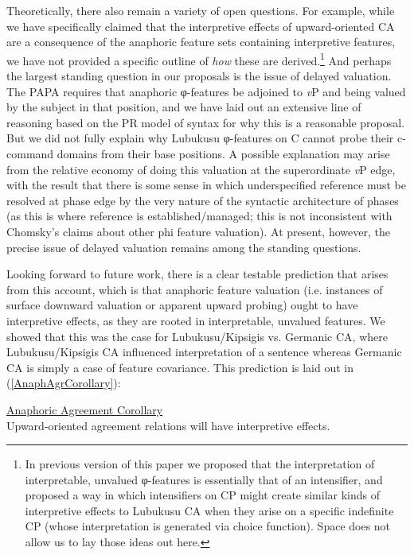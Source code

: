 \documentclass[output=paper
,modfonts
,nonflat
]{langsci/langscibook}
\begin{document}
Theoretically, there also remain a variety of open questions. For example, while we have specifically claimed that the interpretive effects of upward-oriented CA are a consequence of the anaphoric feature sets containing interpretive features, we have not provided a specific outline of \textit{how} these are derived.\footnote{In previous version of this paper we proposed that the interpretation of interpretable, unvalued φ-features is essentially that of an intensifier, and proposed a way in which intensifiers on CP might create similar kinds of interpretive effects to Lubukusu CA when they arise on a specific indefinite CP (whose interpretation is generated via choice function). Space does not allow us to lay those ideas out here.} And perhaps the largest standing question in our proposals is the issue of delayed valuation. The PAPA requires that anaphoric φ-features be adjoined to \textit{v}P and being valued by the subject in that position, and we have laid out an extensive line of reasoning based on the PR model of syntax for why this is a reasonable proposal. But we did not fully explain why Lubukusu φ-features on C cannot probe their c-command domains from their base positions. A possible explanation may arise from the relative economy of doing this valuation at the superordinate \textit{v}P edge, with the result that there is some sense in which underspecified reference must be resolved at phase edge by the very nature of the syntactic architecture of phases (as this is where reference is established/managed; this is not inconsistent with Chomsky's \citeyear{Chomsky:2008} claims about other phi feature valuation). At present, however, the precise issue of delayed valuation remains among the standing questions. 

Looking forward to future work, there is a clear testable prediction that arises from this account, which is that anaphoric feature valuation (i.e. instances of surface downward valuation or apparent upward probing) ought to have interpretive effects, as they are rooted in interpretable, unvalued features. We showed that this was the case for Lubukusu/Kipsigis vs. Germanic CA, where Lubukusu/Kipsigis CA influenced interpretation of a sentence whereas Germanic CA is simply a case of feature covariance. This prediction is laid out in (\ref{AnaphAgrCorollary}): 

\ea \label{AnaphAgrCorollary}
\underline{Anaphoric Agreement Corollary} \\
Upward-oriented agreement relations will have interpretive effects.
\z
\end{document}
